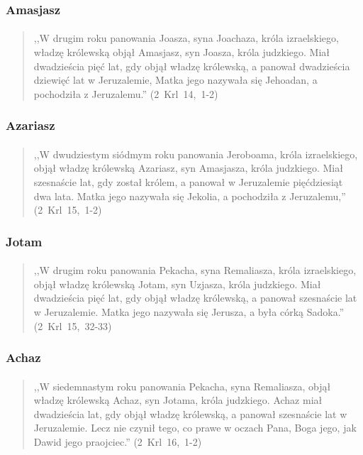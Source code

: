 \documentclass[10pt,a4paper,oneside]{article}
\begin{document}
\subsubsection{Amasjasz}
\paragraph{}
\begin{quote}
,,W drugim roku panowania Joasza, syna Joachaza, króla izraelskiego, władzę królewską objął Amasjasz, syn Joasza, króla judzkiego. Miał dwadzieścia pięć lat, gdy objął władzę królewską, a panował dwadzieścia dziewięć lat w Jeruzalemie, Matka jego nazywała się Jehoadan, a pochodziła z Jeruzalemu.'' \mbox{(2 Krl 14, 1-2)}
\end{quote}
\subsubsection{Azariasz}
\paragraph{}
\begin{quote}
,,W dwudziestym siódmym roku panowania Jeroboama, króla izraelskiego, objął władzę królewską Azariasz, syn Amasjasza, króla judzkiego. Miał szesnaście lat, gdy został królem, a panował w Jeruzalemie pięćdziesiąt dwa lata. Matka jego nazywała się Jekolia, a pochodziła z Jeruzalemu,'' \mbox{(2 Krl 15, 1-2)}
\end{quote}
\subsubsection{Jotam}
\paragraph{}
\begin{quote}
,,W drugim roku panowania Pekacha, syna Remaliasza, króla izraelskiego, objął władzę królewską Jotam, syn Uzjasza, króla judzkiego. Miał dwadzieścia pięć lat, gdy objął władzę królewską, a panował szesnaście lat w Jeruzalemie. Matka jego nazywała się Jerusza, a była córką Sadoka.'' \mbox{(2 Krl 15, 32-33)}
\end{quote}
\subsubsection{Achaz}
\paragraph{}
\begin{quote}
,,W siedemnastym roku panowania Pekacha, syna Remaliasza, objął władzę królewską Achaz, syn Jotama, króla judzkiego. Achaz miał dwadzieścia lat, gdy objął władzę królewską, a panował szesnaście lat w Jeruzalemie. Lecz nie czynił tego, co prawe w oczach Pana, Boga jego, jak Dawid jego praojciec.'' \mbox{(2 Krl 16, 1-2)}
\end{quote}
\end{document}
